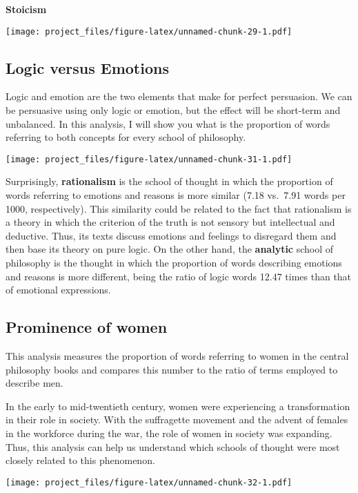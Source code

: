 \documentclass[
]{article}
\begin{document}
\textbf{Stoicism}

\texttt{[image: project\_files/figure-latex/unnamed-chunk-29-1.pdf]}

\hypertarget{logic-versus-emotions}{%
\subsection{Logic versus Emotions}\label{logic-versus-emotions}}

Logic and emotion are the two elements that make for perfect persuasion.
We can be persuasive using only logic or emotion, but the effect will be
short-term and unbalanced. In this analysis, I will show you what is the
proportion of words referring to both concepts for every school of
philosophy.

\texttt{[image: project\_files/figure-latex/unnamed-chunk-31-1.pdf]}

Surprisingly, \textbf{rationalism} is the school of thought in which the
proportion of words referring to emotions and reasons is more similar
(7.18 vs.~7.91 words per 1000, respectively). This similarity could be
related to the fact that rationalism is a theory in which the criterion
of the truth is not sensory but intellectual and deductive. Thus, its
texts discuss emotions and feelings to disregard them and then base its
theory on pure logic. On the other hand, the \textbf{analytic} school of
philosophy is the thought in which the proportion of words describing
emotions and reasons is more different, being the ratio of logic words
12.47 times than that of emotional expressions.

\hypertarget{prominence-of-women}{%
\subsection{Prominence of women}\label{prominence-of-women}}

This analysis measures the proportion of words referring to women in the
central philosophy books and compares this number to the ratio of terms
employed to describe men.

In the early to mid-twentieth century, women were experiencing a
transformation in their role in society. With the suffragette movement
and the advent of females in the workforce during the war, the role of
women in society was expanding. Thus, this analysis can help us
understand which schools of thought were most closely related to this
phenomenon.

\texttt{[image: project\_files/figure-latex/unnamed-chunk-32-1.pdf]}
\end{document}
